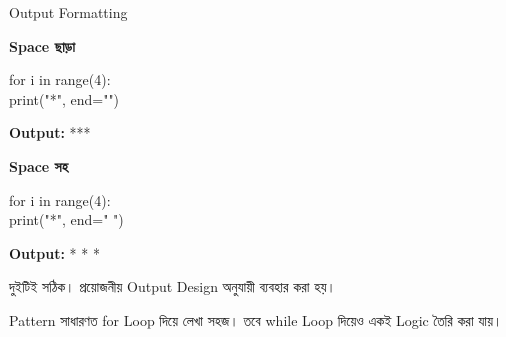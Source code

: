 \begin{codeoutputbox}{Output Formatting}

\noindent
\begin{minipage}[t]{0.48\linewidth}

\textbf{\color{darkTeal}Space ছাড়া}

\begin{english}
\ttfamily
for i in range(4):\\
\hspace*{4mm}print("*", end="")
\end{english}

\medskip

\textbf{Output:}
\textenglish{\ttfamily ****}

\end{minipage}
\hfill
\begin{minipage}[t]{0.48\linewidth}

\textbf{\color{darkTeal}Space সহ}

\begin{english}
\ttfamily
for i in range(4):\\
\hspace*{4mm}print("*", end=" ")
\end{english}

\medskip

\textbf{Output:}
\textenglish{\ttfamily * * * *}

\end{minipage}

\medskip

দুইটিই সঠিক। প্রয়োজনীয় Output Design অনুযায়ী ব্যবহার করা হয়।

\end{codeoutputbox}



Pattern সাধারণত
\textenglish{\ttfamily for}
Loop দিয়ে লেখা সহজ। তবে
\textenglish{\ttfamily while}
Loop দিয়েও একই Logic তৈরি করা যায়।

